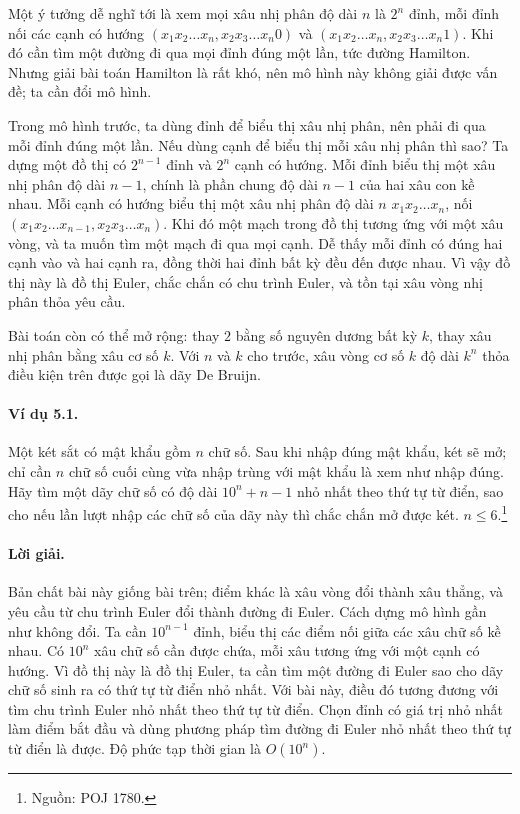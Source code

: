 \documentclass[11pt]{article}
\begin{document}
Một ý tưởng dễ nghĩ tới là xem mọi xâu nhị phân độ dài \(n\) là \(2^n\) đỉnh,
mỗi đỉnh nối các cạnh có hướng
\((x_1x_2\ldots x_n,x_2x_3\ldots x_n0)\) và
\((x_1x_2\ldots x_n,x_2x_3\ldots x_n1)\). Khi đó cần tìm một đường đi qua mọi
đỉnh đúng một lần, tức đường Hamilton. Nhưng giải bài toán Hamilton là rất khó,
nên mô hình này không giải được vấn đề; ta cần đổi mô hình.

Trong mô hình trước, ta dùng đỉnh để biểu thị xâu nhị phân, nên phải đi qua mỗi
đỉnh đúng một lần. Nếu dùng cạnh để biểu thị mỗi xâu nhị phân thì sao? Ta dựng
một đồ thị có \(2^{n-1}\) đỉnh và \(2^n\) cạnh có hướng. Mỗi đỉnh biểu thị một
xâu nhị phân độ dài \(n-1\), chính là phần chung độ dài \(n-1\) của hai xâu con
kề nhau. Mỗi cạnh có hướng biểu thị một xâu nhị phân độ dài \(n\)
\(x_1x_2\ldots x_n\), nối
\((x_1x_2\ldots x_{n-1},x_2x_3\ldots x_n)\). Khi đó một mạch trong đồ thị tương
ứng với một xâu vòng, và ta muốn tìm một mạch đi qua mọi cạnh. Dễ thấy mỗi
đỉnh có đúng hai cạnh vào và hai cạnh ra, đồng thời hai đỉnh bất kỳ đều đến
được nhau. Vì vậy đồ thị này là đồ thị Euler, chắc chắn có chu trình Euler, và
tồn tại xâu vòng nhị phân thỏa yêu cầu.

Bài toán còn có thể mở rộng: thay \(2\) bằng số nguyên dương bất kỳ \(k\), thay
xâu nhị phân bằng xâu cơ số \(k\). Với \(n\) và \(k\) cho trước, xâu vòng cơ số
\(k\) độ dài \(k^n\) thỏa điều kiện trên được gọi là dãy De Bruijn.

\paragraph{Ví dụ 5.1.}
Một két sắt có mật khẩu gồm \(n\) chữ số. Sau khi nhập đúng mật khẩu, két sẽ
mở; chỉ cần \(n\) chữ số cuối cùng vừa nhập trùng với mật khẩu là xem như nhập
đúng. Hãy tìm một dãy chữ số có độ dài \(10^n+n-1\) nhỏ nhất theo thứ tự từ
điển, sao cho nếu lần lượt nhập các chữ số của dãy này thì chắc chắn mở được
két. \(n\le 6\).\footnote{Nguồn: POJ 1780.}

\paragraph{Lời giải.}
Bản chất bài này giống bài trên; điểm khác là xâu vòng đổi thành xâu thẳng, và
yêu cầu từ chu trình Euler đổi thành đường đi Euler. Cách dựng mô hình gần như
không đổi. Ta cần \(10^{n-1}\) đỉnh, biểu thị các điểm nối giữa các xâu chữ số
kề nhau. Có \(10^n\) xâu chữ số cần được chứa, mỗi xâu tương ứng với một cạnh
có hướng. Vì đồ thị này là đồ thị Euler, ta cần tìm một đường đi Euler sao cho
dãy chữ số sinh ra có thứ tự từ điển nhỏ nhất. Với bài này, điều đó tương đương
với tìm chu trình Euler nhỏ nhất theo thứ tự từ điển. Chọn đỉnh có giá trị nhỏ
nhất làm điểm bắt đầu và dùng phương pháp tìm đường đi Euler nhỏ nhất theo thứ
tự từ điển là được. Độ phức tạp thời gian là \(O(10^n)\).
\end{document}
